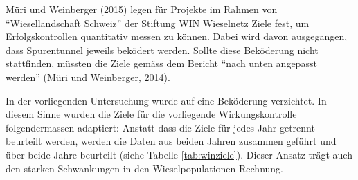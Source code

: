 \documentclass[
  oneside]{scrbook}
\begin{document}
Müri und Weinberger (2015) legen für Projekte im Rahmen von ``Wiesellandschaft Schweiz'' der Stiftung WIN Wieselnetz Ziele fest, um Erfolgskontrollen quantitativ messen zu können. Dabei wird davon ausgegangen, dass Spurentunnel jeweils beködert werden. Sollte diese Beköderung nicht stattfinden, müssten die Ziele gemäss dem Bericht ``nach unten angepasst werden'' (Müri und Weinberger, 2014).

In der vorliegenden Untersuchung wurde auf eine Beköderung verzichtet. In diesem Sinne wurden die Ziele für die vorliegende Wirkungskontrolle folgendermassen adaptiert: Anstatt dass die Ziele für jedes Jahr getrennt beurteilt werden, werden die Daten aus beiden Jahren zusammen geführt und über beide Jahre beurteilt (siehe Tabelle \ref{tab:winziele}). Dieser Ansatz trägt auch den starken Schwankungen in den Wieselpopulationen Rechnung.
\end{document}
